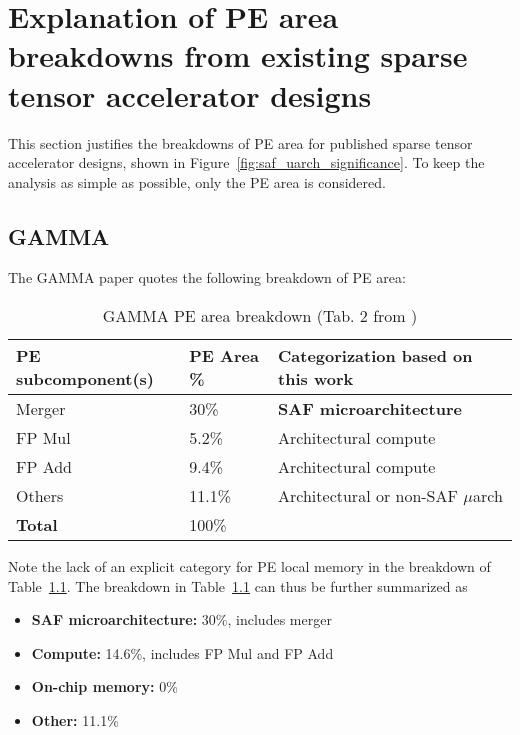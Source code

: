 \chapter{Explanation of PE area breakdowns from existing sparse tensor accelerator designs}
\label{appendix:pe_breakdowns}

This section justifies the breakdowns of PE area for published sparse tensor accelerator designs, shown in Figure~\ref{fig:saf_uarch_significance}. To keep the analysis as simple as possible, only the PE area is considered.

\section{GAMMA\cite{gamma}}
\label{appendix:pe_breakdowns_gamma}

The GAMMA\cite{gamma} paper quotes the following breakdown of PE area:

\begin{table}
\caption{GAMMA PE area breakdown (Tab. 2 from \cite{gamma})}
\label{tab:gamma_pe_breakdown}
\begin{center}
\begin{tabular}{||l|l|l||}\hline
\textbf{PE subcomponent(s)} & \textbf{PE Area} \%  & \textbf{Categorization based on this work}  \\\hline
Merger	   & 30\% & \textbf{SAF microarchitecture} \\\hline
FP Mul	   & 5.2\% & Architectural compute \\\hline
FP Add	   & 9.4\% & Architectural compute \\\hline
Others	   & 11.1\% & Architectural or non-SAF $\mu$arch \\\hline
\textbf{Total}	   & 100\% & \\\hline
\end{tabular}
\end{center}
\end{table}

Note the lack of an explicit category for PE local memory in the breakdown of Table~\ref{tab:gamma_pe_breakdown}. The breakdown in Table~\ref{tab:gamma_pe_breakdown} can thus be further summarized as

\begin{itemize}
    \item \textbf{SAF microarchitecture:} 30\%, includes merger
    \item \textbf{Compute:} 14.6\%, includes FP Mul and FP Add
    \item \textbf{On-chip memory:} 0\%
    \item \textbf{Other:} 11.1\%
\end{itemize}

